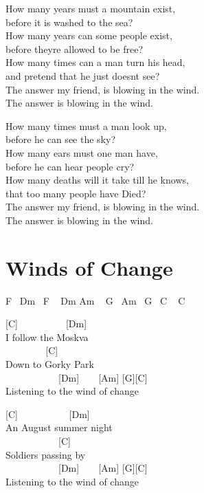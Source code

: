 \documentclass[
  letterpaper,
  twoside=false]{scrbook}
\begin{document}
How many years must a mountain exist,\\
before it is washed to the sea?\\
How many years can some people exist,\\
before they\textquotesingle re allowed to be free?\\
How many times can a man turn his head,\\
and pretend that he just doesn\textquotesingle t see?\\
The answer my friend, is blowing in the wind.\\
The answer is blowing in the wind.

How many times must a man look up,\\
before he can see the sky?\\
How many ears must one man have,\\
before he can hear people cry?\\
How many deaths will it take \textquotesingle till he knows,\\
that too many people have Died?\\
The answer my friend, is blowing in the wind.\\
The answer is blowing in the wind.

\hypertarget{winds-of-change}{%
\chapter{Winds of Change}\label{winds-of-change}}

F ~Dm ~F ~ Dm Am ~ G ~Am ~G ~C ~ C

{[}C{]} ~ ~ ~ ~ ~ ~{[}Dm{]}\\
I follow the Moskva\\
\hspace*{0.333em} ~ ~ ~ ~ ~ {[}C{]}\\
Down to Gorky Park\\
\hspace*{0.333em} ~ ~ ~ ~ ~ ~ ~{[}Dm{]} ~ ~ {[}Am{]} {[}G{]}{[}C{]}\\
Listening to the wind of change

{[}C{]} ~ ~ ~ ~ ~ ~ {[}Dm{]}\\
An August summer night\\
\hspace*{0.333em} ~ ~ ~ ~ ~ ~ ~{[}C{]}\\
Soldiers passing by\\
\hspace*{0.333em} ~ ~ ~ ~ ~ ~ ~{[}Dm{]} ~ ~ {[}Am{]} {[}G{]}{[}C{]}\\
Listening to the wind of change
\end{document}
